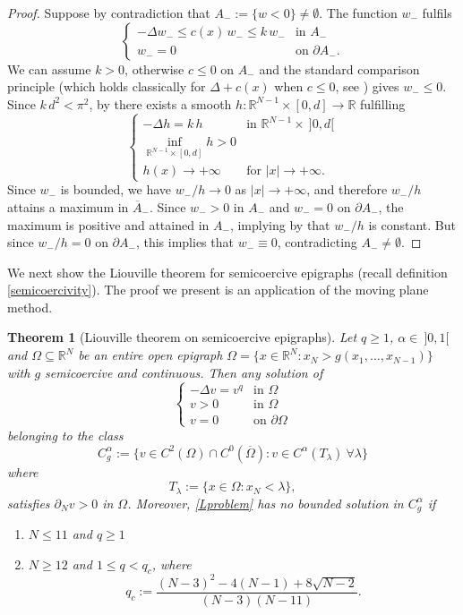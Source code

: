 \documentclass[12pt]{amsart}
\numberwithin{equation}{section}
\newtheorem{theorem}{Theorem}[section]
\theoremstyle{plain}
\theoremstyle{plain}
\theoremstyle{plain}
\theoremstyle{definition}
\newcommand{\R}{{\mathbb R}}
\newcommand{\beq}{\begin{equation}}
\newcommand{\eeq}{\end{equation}}
\renewcommand{\le}{\leqslant}
\renewcommand{\ge}{\geqslant}
\begin{document}
\begin{proof}
Suppose by contradiction that $A_-:=\{w<0\}\ne \emptyset$. The function $w_-$ fulfils 
\[
\begin{cases}
-\Delta w_-\le c(x)\, w_-\le k\, w_-&\text{in $A_-$}\\
w_-= 0&\text{on $\partial A_-$}.
\end{cases}
\]
We can assume $k>0$, otherwise $c\le 0$ on $A_-$ and the standard comparison principle (which holds classically for $\Delta +c(x) $ when $c\le 0$, see \cite[Corollary 2.8]{HaLi11}) gives $w_-\le 0$. 
Since $k\, d^2<\pi^2$, by \cite[Lemma 21.11]{QuSo19} there exists a smooth $h:\R^{N-1}\times [0, d]\to \R$ fulfilling
\[
\begin{cases}
-\Delta h=k\, h&\text{in $\R^{N-1}\times \ ]0, d[$}\\
\inf_{\R^{N-1}\times [0, d]} h>0\\
h(x)\to +\infty & \text{for $|x|\to +\infty$}.
\end{cases}
\]
Since $w_-$ is bounded, we have $w_-/h\to 0$ as $|x|\to +\infty$, and therefore $w_-/h$ attains a maximum in $\overline{A}_-$. 
Since $w_->0$ in $A_-$ and $w_-=0$ on $\partial A_-$, the maximum is positive and attained in $A_-$, implying by \cite[Theorem 2.11]{HaLi11} that $w_-/h$ is constant. 
But since $w_-/h=0$ on $\partial A_-$, this implies that $w_-\equiv 0$, contradicting $A_-\ne \emptyset$.
\end{proof}

We next show the Liouville theorem for semicoercive epigraphs (recall definition \eqref{semicoercivity}). 
The proof we present is an application of the moving plane method.

\begin{theorem}[Liouville theorem on semicoercive epigraphs]
\label{thm_liouville}
Let $q\ge 1$, $\alpha\in \ ]0, 1[$ and $\Omega\subseteq \R^N$ be an entire open epigraph $\Omega=\{x \in \R^N : x_N > g(x_1, \dots, x_{N-1})\}$ with $g$ semicoercive and continuous. 
Then any solution of 
\beq
\label{Lproblem}
\begin{cases}
-\Delta v=v^q&\text{in $\Omega$}\\
v>0&\text{in $\Omega$}\\
v=0&\text{on $\partial\Omega$}
\end{cases}
\eeq
belonging to the class
\[
C^\alpha_g:=\{v\in C^2(\Omega)\cap C^0(\overline{\Omega}): v\in C^\alpha(T_\lambda) \ \forall \lambda\}
\]
where 
\beq
\label{defTlambda}
T_\lambda:=\big\{x \in \Omega : x_N < \lambda\big\},
\eeq
satisfies $\partial_N v>0$ in $\Omega$.
Moreover, \eqref{Lproblem} has no bounded solution in $C^\alpha_g$ if 
\begin{enumerate}
\item
$N\le 11$ and $q\ge 1$
\item
$N\ge 12$ and $1\le q<q_c$, where
\beq
\label{pcritfarina}
q_c:=\frac{(N-3)^2-4(N-1)+8\sqrt{N-2}}{(N-3)(N-11)}.
\eeq
\end{enumerate}
 \end{theorem}
\end{document}
